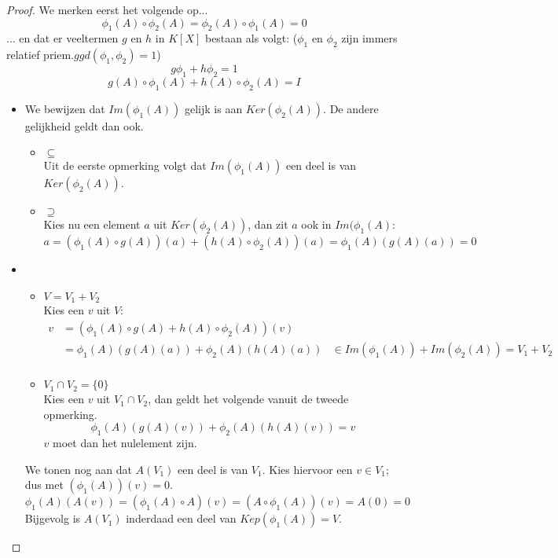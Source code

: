 \documentclass[main.tex]{subfiles}
\begin{document}
\begin{pr}
  \begin{proof}
    We merken eerst het volgende op...
    \[ \phi_{1}(A) \circ \phi_{2}(A) = \phi_{2}(A) \circ \phi_{1}(A) = 0 \]
    ... en dat er veeltermen $g$ en $h$ in $K[X]$ bestaan als volgt: ($\phi_{1}$ en $\phi_{2}$ zijn immers relatief priem.$ggd(\phi_{1},\phi_{2}) =1$)\needed
    \[ g\phi_{1}+h\phi_{2} =1\]
    \[ g(A) \circ \phi_{1}(A) + h(A) \circ \phi_{2}(A) = I \]
    \begin{itemize}
    \item We bewijzen dat $Im(\phi_{1}(A))$ gelijk is aan $Ker(\phi_{2}(A))$.
      De andere gelijkheid geldt dan ook.
      \begin{itemize}
      \item $\subseteq$\\
        Uit de eerste opmerking volgt dat $Im(\phi_{1}(A))$ een deel is van $Ker(\phi_{2}(A))$.
      \item $\supseteq$\\
        Kies nu een element $a$ uit $Ker(\phi_{2}(A))$, dan zit $a$ ook in $Im(\phi_{1}(A)$:
        \[ a = \left(\phi_{1}(A) \circ g(A)\right)(a) + \left(h(A) \circ \phi_{2}(A)\right)(a) = \phi_{1}(A)(g(A)(a)) = 0\]
      \end{itemize}
    \item
      \begin{itemize}
      \item $V=V_{1}+V_{2}$\\
        Kies een $v$ uit $V$:
        \[
        \begin{array}{rll}
          v&= \left( \phi_{1}(A) \circ g(A) + h(A) \circ \phi_{2}(A)\right)(v) &\\
          &= \phi_{1}(A)(g(A)(a))+\phi_{2}(A)(h(A)(a)) & \in Im(\phi_{1}(A))+Im(\phi_{2}(A))=V_{1}+V_{2} \\
        \end{array}\]
      \item $V_{1}\cap V_{2} = \{0\}$\\
        Kies een $v$ uit $V_{1}\cap V_{2}$, dan geldt het volgende vanuit de tweede opmerking.
        \[ \phi_{1}(A)(g(A)(v)) + \phi_{2}(A) (h(A)(v)) = v \]
        $v$ moet dan het nulelement zijn.
      \end{itemize}
   We tonen nog aan dat $A(V_{1})$ een deel is van $V_{1}$.
      Kies hiervoor een $v\in V_{1}$; dus met $(\phi_{1}(A))(v) = 0$.
      \[
      \phi_{1}(A)(A(v)) = (\phi_{1}(A) \circ A)(v) = (A \circ \phi_{1}(A))(v) = A(0) = 0
      \]
      Bijgevolg is $A(V_{1})$ inderdaad een deel van $Kep(\phi_{1}(A)) = V$.

\end{itemize}
\end{proof}
\end{pr}
\end{document}
